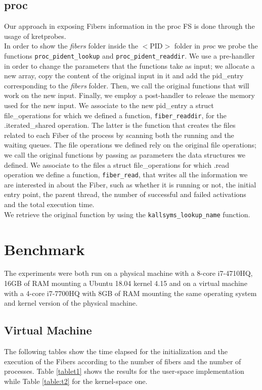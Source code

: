 \documentclass[11pt]{article}
\begin{document}
\subsection{proc}
Our approach in exposing Fibers information in the proc FS is done through the usage of kretprobes.\\ %
In order to show the \textit{fibers} folder inside the $<$PID$>$ folder in \textit{proc} we probe the functions \texttt{proc\_pident\_lookup} and \texttt{proc\_pident\_readdir}. We use a pre-handler in order to change the parameters that the functions take as input; we allocate a new array, copy the content of the original input in it and add the pid\_entry corresponding to the \textit{fibers} folder. Then, we call the original functions that will work on the new input. Finally, we employ a post-handler to release the memory used for the new input. We associate to the new pid\_entry a struct file\_operations for which we defined a function, 	\texttt{fiber\_readdir}, for the .iterated\_shared operation. The latter is the function that creates the files related to each Fiber of the process by scanning both the running and the waiting queues. The file operations we defined rely on the original file operations; we call the original functions by passing as parameters the data structures we defined. We associate to the files a struct file\_operations for which .read operation we define a function, \texttt{fiber\_read}, that writes all the information we are interested in about the Fiber, such as whether it is running or not, the initial entry point, the parent thread, the number of successful and failed activations and the total execution time.\\
We retrieve the original function by using the \texttt{kallsyms\_lookup\_name} function.

\section{Benchmark}
The experiments were both run on a physical machine with a 8-core i7-4710HQ, 16GB of RAM mounting a Ubuntu 18.04 kernel 4.15 and on a virtual machine with a 4-core i7-7700HQ with 8GB of RAM mounting the same operating system and kernel version of the physical machine.


\subsection{Virtual Machine}
The following tables show the time elapsed for the initialization and the execution of the Fibers according to the number of fibers and the number of processes. Table \ref{tablet1} shows the results for the user-space implementation while Table \ref{table:t2} for the kernel-space one.
\end{document}
